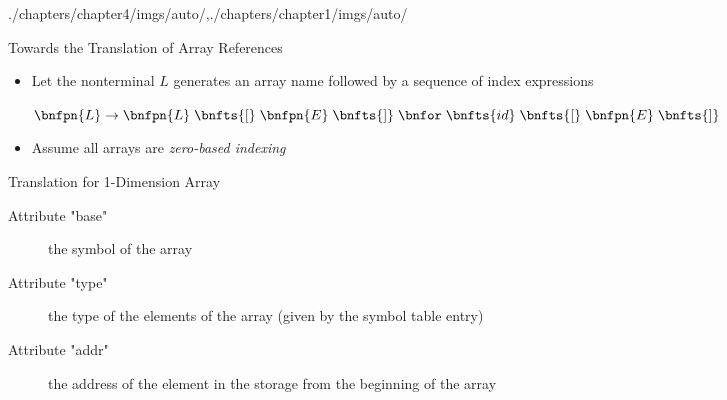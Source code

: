 \begin{graphicspathcontext}{{./chapters/chapter4/imgs/auto/},{./chapters/chapter1/imgs/auto/}}
\begin{bibunit}[apalike]
\begin{frame}[background=8]{Towards the Translation of Array References}
	\vfill
	\begin{itemize}
	\item Let the nonterminal $L$ generates an array name followed by a sequence of index expressions
		\begin{center}
			$\bnfpn{L} \bnfopo \bnfpn{L} \; \bnfts{[} \; \bnfpn{E} \; \bnfts{]} \; \bnfor \; \bnfts{id} \; \bnfts{[} \; \bnfpn{E} \; \bnfts{]}$
		\end{center}
	\vfill
	\item Assume all arrays are \emph{zero-based indexing}
	\end{itemize}
\end{frame}

\begin{frame}[background=9]{Translation for 1-Dimension Array}
		\begin{sdd}
		\end{sdd}
	\vspace{1cm}
	\begin{description}
	\item[Attribute "base"] the symbol of the array
	\item[Attribute "type"] the type of the elements of the array (given by the symbol table entry)
	\item[Attribute "addr"] the address of the element in the storage from the beginning of the array
	\end{description}
\end{frame}


\end{bibunit}
\end{graphicspathcontext}
